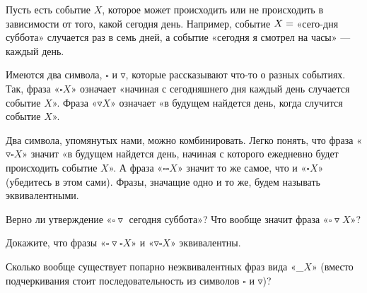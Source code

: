 ﻿
\noindent Пусть есть событие $X$, которое может происходить или не происходить в зависимости от того, какой сегодня день. Например, событие $X = \vphantom{x}$«сего-\linebreak дня суббота» случается раз в семь дней, а событие «сегодня я смотрел на часы» — каждый день. 

\def\sq{\square}
\def\td{\triangledown}
\ms Имеются два символа, $\square$ и $\triangledown$, которые рассказывают что-то о разных событиях. Так, фраза «$\sq X$» означает «начиная с сегодняшнего дня каждый день случается событие $X$». Фраза «$\td X$» означает «в будущем найдется день, когда случится событие $X$».

\ms Два символа, упомянутых нами, можно комбинировать. Легко понять, что фраза «$\td\sq X$» значит «в будущем найдется день, начиная с которого ежедневно будет происходить событие $X$». А фраза «$\sq\sq X$» значит то же самое, что и «$\sq X$» (убедитесь в этом сами). Фразы, значащие одно и то же, будем называть эквивалентными.

\begin{enumerate}
\itA Верно ли утверждение «$\sq\td \text{ сегодня суббота}$»? Что вообще значит фраза «$\sq\td X$»?

\itB Докажите, что фразы «$\sq\td\sq X$» и «$\td\sq X$» эквивалентны.

\itC Сколько вообще существует попарно неэквивалентных фраз вида «\_$X$» (вместо подчеркивания стоит последовательность из символов $\sq$ и $\td$)?
\end{enumerate}